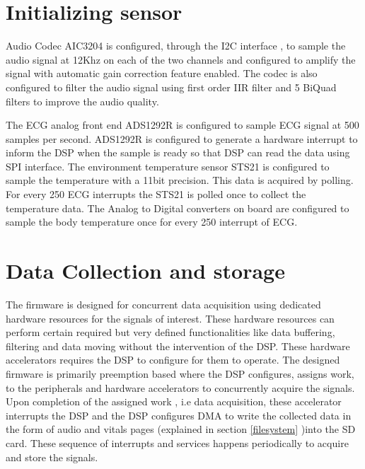 \section{Initializing sensor}
Audio Codec AIC3204 is configured, through the I2C interface , to sample the audio signal at 12Khz on each of the two channels and configured to amplify the signal with automatic gain correction feature enabled. The codec is also configured to filter the audio signal using first order IIR filter and 5 BiQuad filters to improve the audio quality. 

The ECG analog front end ADS1292R is configured to sample ECG signal at 500 samples per second. ADS1292R is configured to generate a hardware interrupt to inform the DSP when the sample is ready so that DSP can read the data using SPI interface. 
The environment temperature sensor STS21 is configured to sample the temperature with a 11bit precision. This data is acquired by polling. For every 250 ECG interrupts the STS21 is polled once to collect the temperature data.  
The Analog to Digital converters on board are configured to  sample the body temperature once for every 250 interrupt of ECG.

\section{Data Collection and storage}
The firmware is designed for concurrent data acquisition using dedicated hardware resources for the signals of interest. These hardware resources can perform certain required but  very defined functionalities like data buffering, filtering and data moving  without the intervention of the DSP. These hardware accelerators requires the DSP to configure for them to operate. The designed firmware is primarily preemption based where the DSP configures, assigns work, to the peripherals and hardware accelerators to concurrently acquire the signals. Upon completion of the assigned work , i.e data acquisition, these accelerator interrupts the DSP and the DSP configures DMA to write the collected data in the form of  audio and vitals pages (explained in section \ref{filesystem} )into the SD card. These sequence of interrupts and services happens periodically to acquire and store the signals.

